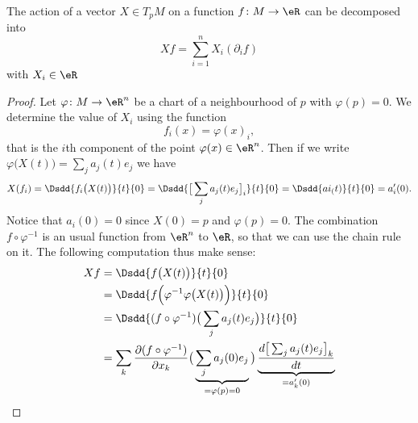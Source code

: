 \begin{lemma}       \label{LEMooXDESooHXzIJU}
	The action of a vector \( X\in T_pM\) on a function \( f\colon M\to \eR\) can be decomposed into
	\begin{equation}
		Xf=\sum_{i=1}^n X_i(\partial_if)
	\end{equation}
	with \( X_i\in\eR\)
\end{lemma}

\begin{proof}
	Let \( \varphi\colon M\to \eR^n\) be a chart of a neighbourhood of \( p\) with \( \varphi(p)=0\). We determine the value of \( X_i\) using the function
	\begin{equation}
		f_i(x)=\varphi(x)_i,
	\end{equation}
	that is the \( i\)th component of the point \( \varphi(x)\in\eR^n\). Then if we write \( \varphi\big( X(t) \big)=\sum_j a_j(t)e_j\) we have
	\begin{subequations}
		\begin{align}
			X(f_i)=\Dsdd{ f_i\big( X(t) \big) }{t}{0}=\Dsdd{ \big[ \sum_ja_j(t)e_j \big]_i }{t}{0}=\Dsdd{ ai_(t) }{t}{0}=a_i'(0).
		\end{align}
	\end{subequations}
	Notice that \( a_i(0)=0\) since \( X(0)=p\) and \( \varphi(p)=0\). The combination \( f\circ\varphi^{-1}\) is an usual function from \( \eR^n\) to \( \eR\), so that we can use the chain rule on it. The following computation thus make sense:
	\begin{subequations}
		\begin{align}
			Xf & =\Dsdd{ f\big( X(t) \big) }{t}{0}                                                                                                                                                            \\
			   & =\Dsdd{ f\Big( \varphi^{-1}\varphi\big( X(t) \big) \Big) }{t}{0}                                                                                                                             \\
			   & =\Dsdd{ (f\circ\varphi^{-1})\big( \sum_ja_j(t)e_j \big) }{t}{0}                                                                                                                              \\
			   & =\sum_k \frac{ \partial (f\circ\varphi^{-1}) }{ \partial x_k }\big( \underbrace{\sum_ja_j(0)e_j}_{=\varphi(p)=0} \big)\underbrace{\frac{ d\big[ \sum_ja_j(t)e_j \big]_k  }{ dt }}_{=a'_k(0)} \\

\end{align}
\end{subequations}
\end{proof}
